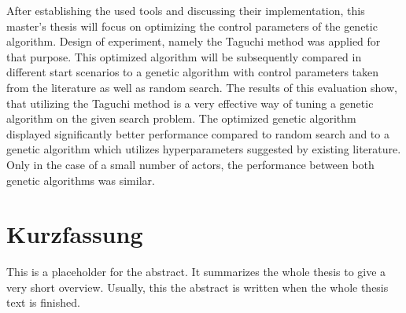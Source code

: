 After establishing the used tools and discussing their implementation, this master's thesis will focus on optimizing the control parameters of the genetic algorithm. Design of experiment, namely the Taguchi method was applied for that purpose. This optimized algorithm will be subsequently compared in different start scenarios to a genetic algorithm with control parameters taken from the literature as well as random search. The results of this evaluation show, that utilizing the Taguchi method is a very effective way of tuning a genetic algorithm on the given search problem. The optimized genetic algorithm displayed significantly better performance compared to random search and to a genetic algorithm which utilizes hyperparameters suggested by existing literature. Only in the case of a small number of actors, the performance between both genetic algorithms was similar.


\chapter*{Kurzfassung}
\label{chap:kurzfassung}


This is a placeholder for the abstract. It summarizes the whole thesis
to give a very short overview. Usually, this the abstract is written
when the whole thesis text is finished.



